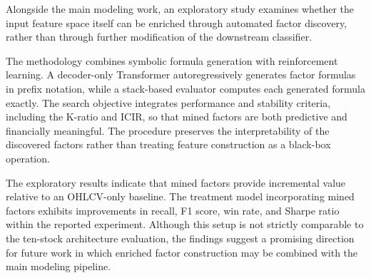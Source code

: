 \documentclass[12pt]{article}
\begin{document}
Alongside the main modeling work, an exploratory study examines whether the input feature space itself can be enriched through automated factor discovery, rather than through further modification of the downstream classifier.

The methodology combines symbolic formula generation with reinforcement learning. A decoder-only Transformer autoregressively generates factor formulas in prefix notation, while a stack-based evaluator computes each generated formula exactly. The search objective integrates performance and stability criteria, including the K-ratio and ICIR, so that mined factors are both predictive and financially meaningful. The procedure preserves the interpretability of the discovered factors rather than treating feature construction as a black-box operation.

The exploratory results indicate that mined factors provide incremental value relative to an OHLCV-only baseline. The treatment model incorporating mined factors exhibits improvements in recall, F1 score, win rate, and Sharpe ratio within the reported experiment. Although this setup is not strictly comparable to the ten-stock architecture evaluation, the findings suggest a promising direction for future work in which enriched factor construction may be combined with the main modeling pipeline.

\begin{table}[H]
    \centering
    \scriptsize
    \caption{Classification metrics reported for the factor-mining approach.}
\end{table}

\begin{table}[H]
    \centering
    \scriptsize
    \caption{Financial backtest metrics reported for the factor-mining approach.}
\end{table}
\end{document}
